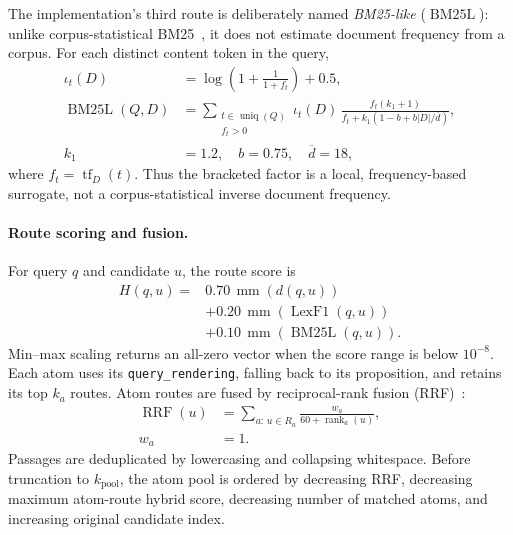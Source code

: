 The implementation's third route is deliberately named
\emph{BM25-like} (\(\operatorname{BM25L}\)): unlike corpus-statistical
BM25~\citep{Robertson2009BM25}, it does not estimate document frequency
from a corpus.  For each distinct content token in the query,
\begin{equation}
\begin{aligned}
\iota_t(D)
&=\log\!\left(1+\frac{1}{1+f_t}\right)+0.5,\\
\operatorname{BM25L}(Q,D)
&=\sum_{\substack{t\in\operatorname{uniq}(Q)\\f_t>0}}
\iota_t(D)\,
\frac{f_t(k_1+1)}
{f_t+k_1(1-b+b|D|/\overline d)},\\
k_1&=1.2,\quad b=0.75,\quad \overline d=18,
\end{aligned}
\label{eq:supp-bm25-like}
\end{equation}
where \(f_t=\operatorname{tf}_D(t)\).  Thus the bracketed factor is a local,
frequency-based surrogate, not a corpus-statistical inverse document
frequency.

\paragraph{Route scoring and fusion.}
For query \(q\) and candidate \(u\), the route score is
\begin{equation}
\begin{aligned}
H(q,u)={}&0.70\,\operatorname{mm}(d(q,u))\\
&+0.20\,\operatorname{mm}(\operatorname{LexF1}(q,u))\\
&+0.10\,\operatorname{mm}(\operatorname{BM25L}(q,u)).
\end{aligned}
\label{eq:supp-hybrid-route}
\end{equation}
Min--max scaling returns an all-zero vector when the score range is below
\(10^{-8}\).  Each atom uses its \texttt{query\_rendering}, falling back to
its proposition, and retains its top \(k_a\) routes.  Atom routes are fused
by reciprocal-rank fusion (RRF)~\citep{Cormack2009RRF}:
\begin{equation}
\begin{aligned}
\operatorname{RRF}(u)
&=\sum_{a:\,u\in R_a}
\frac{w_a}{60+\operatorname{rank}_a(u)},\\
w_a&=1.
\end{aligned}
\label{eq:supp-rrf}
\end{equation}
Passages are deduplicated by lowercasing and collapsing whitespace.  Before
truncation to \(k_{\mathrm{pool}}\), the atom pool is ordered by decreasing
RRF, decreasing maximum atom-route hybrid score, decreasing number of
matched atoms, and increasing original candidate index.

